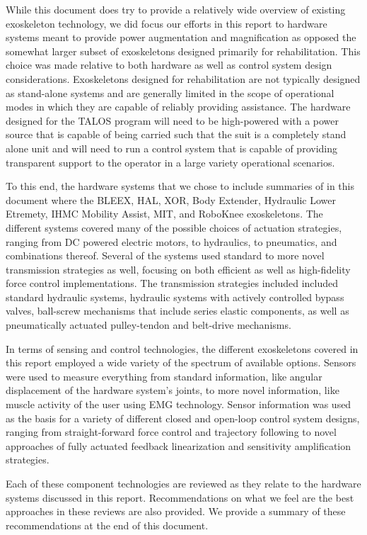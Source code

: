 \documentclass[letterpaper,12pt,fullpage]{article}
\begin{document}
While this document does try to provide a relatively wide overview of existing exoskeleton technology, we did focus our efforts in this report to hardware systems meant to provide power augmentation and magnification as opposed the somewhat larger subset of exoskeletons designed primarily for rehabilitation.  This choice was made relative to both hardware as well as control system design considerations.  Exoskeletons designed for rehabilitation are not typically designed as stand-alone systems and are generally limited in the scope of operational modes in which they are capable of reliably providing assistance.  The hardware designed for the TALOS program will need to be high-powered with a power source that is capable of being carried such that the suit is a completely stand alone unit and will need to run a control system that is capable of providing transparent support to the operator in a large variety operational scenarios.

To this end, the hardware systems that we chose to include summaries of in this document where the BLEEX, HAL, XOR, Body Extender, Hydraulic Lower Etremety, IHMC Mobility Assist, MIT, and RoboKnee exoskeletons.  The different systems covered many of the possible choices of actuation strategies, ranging from DC powered electric motors, to hydraulics, to pneumatics, and combinations thereof.  Several of the systems used standard to more novel transmission strategies as well, focusing on both efficient as well as high-fidelity force control implementations.  The transmission strategies included included standard hydraulic systems, hydraulic systems with actively controlled bypass valves, ball-screw mechanisms that include series elastic components, as well as pneumatically actuated pulley-tendon and belt-drive mechanisms. 

In terms of sensing and control technologies, the different exoskeletons covered in this report employed a wide variety of the spectrum of available options.  Sensors were used to measure everything from standard information, like angular displacement of the hardware system's joints, to more novel information, like muscle activity of the user using EMG technology.  Sensor information was used as the basis for a variety of different closed and open-loop control system designs, ranging from straight-forward force control and trajectory following to novel approaches of fully actuated feedback linearization and sensitivity amplification strategies.  

Each of these component technologies are reviewed as they relate to the hardware systems discussed in this report.  Recommendations on what we feel are the best approaches in these reviews are also provided.  We provide a summary of these recommendations at the end of this document.
\end{document}
